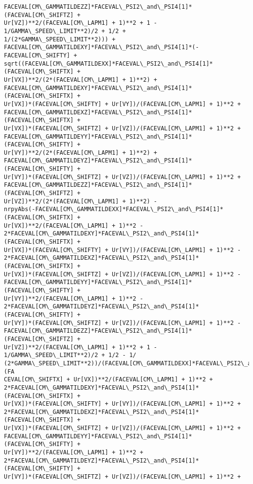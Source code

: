 \documentclass[landscape,letterpaper,10pt,english]{article}
\begin{document}
\begin{Verbatim}[commandchars=\\\{\}]
FACEVAL[CM\_GAMMATILDEZZ]*FACEVAL\_PSI2\_and\_PSI4[1]*(FACEVAL[CM\_SHIFTZ] +
Ur[VZ])**2/(FACEVAL[CM\_LAPM1] + 1)**2 + 1 - 1/GAMMA\_SPEED\_LIMIT**2)/2 + 1/2 +
1/(2*GAMMA\_SPEED\_LIMIT**2))) +
FACEVAL[CM\_GAMMATILDEXY]*FACEVAL\_PSI2\_and\_PSI4[1]*(-FACEVAL[CM\_SHIFTY] +
sqrt((FACEVAL[CM\_GAMMATILDEXX]*FACEVAL\_PSI2\_and\_PSI4[1]*(FACEVAL[CM\_SHIFTX] +
Ur[VX])**2/(2*(FACEVAL[CM\_LAPM1] + 1)**2) +
FACEVAL[CM\_GAMMATILDEXY]*FACEVAL\_PSI2\_and\_PSI4[1]*(FACEVAL[CM\_SHIFTX] +
Ur[VX])*(FACEVAL[CM\_SHIFTY] + Ur[VY])/(FACEVAL[CM\_LAPM1] + 1)**2 +
FACEVAL[CM\_GAMMATILDEXZ]*FACEVAL\_PSI2\_and\_PSI4[1]*(FACEVAL[CM\_SHIFTX] +
Ur[VX])*(FACEVAL[CM\_SHIFTZ] + Ur[VZ])/(FACEVAL[CM\_LAPM1] + 1)**2 +
FACEVAL[CM\_GAMMATILDEYY]*FACEVAL\_PSI2\_and\_PSI4[1]*(FACEVAL[CM\_SHIFTY] +
Ur[VY])**2/(2*(FACEVAL[CM\_LAPM1] + 1)**2) +
FACEVAL[CM\_GAMMATILDEYZ]*FACEVAL\_PSI2\_and\_PSI4[1]*(FACEVAL[CM\_SHIFTY] +
Ur[VY])*(FACEVAL[CM\_SHIFTZ] + Ur[VZ])/(FACEVAL[CM\_LAPM1] + 1)**2 +
FACEVAL[CM\_GAMMATILDEZZ]*FACEVAL\_PSI2\_and\_PSI4[1]*(FACEVAL[CM\_SHIFTZ] +
Ur[VZ])**2/(2*(FACEVAL[CM\_LAPM1] + 1)**2) -
nrpyAbs(-FACEVAL[CM\_GAMMATILDEXX]*FACEVAL\_PSI2\_and\_PSI4[1]*(FACEVAL[CM\_SHIFTX] +
Ur[VX])**2/(FACEVAL[CM\_LAPM1] + 1)**2 -
2*FACEVAL[CM\_GAMMATILDEXY]*FACEVAL\_PSI2\_and\_PSI4[1]*(FACEVAL[CM\_SHIFTX] +
Ur[VX])*(FACEVAL[CM\_SHIFTY] + Ur[VY])/(FACEVAL[CM\_LAPM1] + 1)**2 -
2*FACEVAL[CM\_GAMMATILDEXZ]*FACEVAL\_PSI2\_and\_PSI4[1]*(FACEVAL[CM\_SHIFTX] +
Ur[VX])*(FACEVAL[CM\_SHIFTZ] + Ur[VZ])/(FACEVAL[CM\_LAPM1] + 1)**2 -
FACEVAL[CM\_GAMMATILDEYY]*FACEVAL\_PSI2\_and\_PSI4[1]*(FACEVAL[CM\_SHIFTY] +
Ur[VY])**2/(FACEVAL[CM\_LAPM1] + 1)**2 -
2*FACEVAL[CM\_GAMMATILDEYZ]*FACEVAL\_PSI2\_and\_PSI4[1]*(FACEVAL[CM\_SHIFTY] +
Ur[VY])*(FACEVAL[CM\_SHIFTZ] + Ur[VZ])/(FACEVAL[CM\_LAPM1] + 1)**2 -
FACEVAL[CM\_GAMMATILDEZZ]*FACEVAL\_PSI2\_and\_PSI4[1]*(FACEVAL[CM\_SHIFTZ] +
Ur[VZ])**2/(FACEVAL[CM\_LAPM1] + 1)**2 + 1 - 1/GAMMA\_SPEED\_LIMIT**2)/2 + 1/2 - 1/
(2*GAMMA\_SPEED\_LIMIT**2))/(FACEVAL[CM\_GAMMATILDEXX]*FACEVAL\_PSI2\_and\_PSI4[1]*(FA
CEVAL[CM\_SHIFTX] + Ur[VX])**2/(FACEVAL[CM\_LAPM1] + 1)**2 +
2*FACEVAL[CM\_GAMMATILDEXY]*FACEVAL\_PSI2\_and\_PSI4[1]*(FACEVAL[CM\_SHIFTX] +
Ur[VX])*(FACEVAL[CM\_SHIFTY] + Ur[VY])/(FACEVAL[CM\_LAPM1] + 1)**2 +
2*FACEVAL[CM\_GAMMATILDEXZ]*FACEVAL\_PSI2\_and\_PSI4[1]*(FACEVAL[CM\_SHIFTX] +
Ur[VX])*(FACEVAL[CM\_SHIFTZ] + Ur[VZ])/(FACEVAL[CM\_LAPM1] + 1)**2 +
FACEVAL[CM\_GAMMATILDEYY]*FACEVAL\_PSI2\_and\_PSI4[1]*(FACEVAL[CM\_SHIFTY] +
Ur[VY])**2/(FACEVAL[CM\_LAPM1] + 1)**2 +
2*FACEVAL[CM\_GAMMATILDEYZ]*FACEVAL\_PSI2\_and\_PSI4[1]*(FACEVAL[CM\_SHIFTY] +
Ur[VY])*(FACEVAL[CM\_SHIFTZ] + Ur[VZ])/(FACEVAL[CM\_LAPM1] + 1)**2 +

\end{Verbatim}
\end{document}
